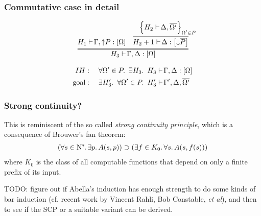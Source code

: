 \documentclass{beamer}
\begin{document}
\begin{frame}
  \frametitle{Commutative case in detail}

  \begin{gather*}
    \infer={
      H_3 \ts \G, \D : [\W]
    }{
      H_1 \ts \G, \SHN P : [\W]
      &
      \infer{
        H_2 + 1 \ts \D : \foc{\SHP \dual P}
      }{
        \Bigl\{{
          H_2 \ts \D, \dual{\W'}
        }\Bigr\}_{\mathrlap{\W' \in P}}
      }
    }
  \end{gather*}

  \bigskip

  \begin{align*}
    IH &:\quad \forall \Omega' \in P.\,\ \exists H_3.\,\
    H_3 {\mathstrut\vdash}\mkern 2mu \Gamma, \Delta : \left[\Omega\right] \\
    \text{goal} &:\quad
    \exists H_3'.\,\ \forall \Omega' \in P.\,\ H_3' {\mathstrut\vdash}\mkern 2mu \Gamma', \Delta, {\mathstrut\overline{\Omega'}}
  \end{align*}
\end{frame}

\begin{frame}
  \frametitle{Strong continuity?}

  This is reminiscent of the so called \emph{strong continuity
    principle}, which is a consequence of Brouwer's fan theorem:
  \begin{gather*}
    (\forall s\in \mathrm{N}^*\mkern -2mu.\, \exists p.\, A(s, p))
    \supset
    (\exists f \in K_0.\, \forall s.\, A(s, f(s)))
  \end{gather*}
  where $K_0$ is the class of all computable functions that depend on
  only a \alert{finite prefix} of its input.

  \bigskip \pause

  TODO: figure out if Abella's induction has enough strength to do
  some kinds of bar induction (cf. recent work by Vincent Rahli, Bob
  Constable, \emph{et al}), and then to see if the SCP or a suitable
  variant can be derived.
\end{frame}
\end{document}

